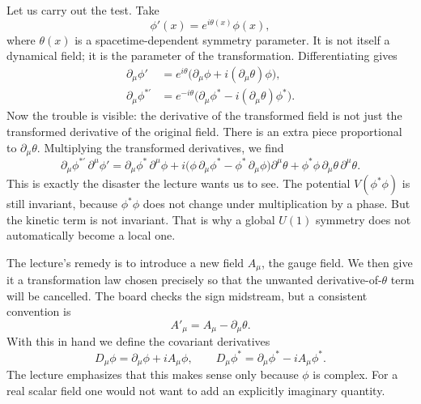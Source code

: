 Let us carry out the test. Take
\begin{equation}
\phi'(x)=e^{i\theta(x)}\phi(x),
\label{eq:local-transform-refined}
\end{equation}
where \(\theta(x)\) is a spacetime-dependent symmetry parameter. It is not itself a dynamical field; it is the parameter of the transformation. Differentiating gives
\begin{align}
\partial_\mu\phi'
&=
e^{i\theta}\big(\partial_\mu\phi+i(\partial_\mu\theta)\phi\big),
\label{eq:dphi-prime-refined}
\\
\partial_\mu\phi^{*\prime}
&=
e^{-i\theta}\big(\partial_\mu\phi^*-i(\partial_\mu\theta)\phi^*\big).
\label{eq:dphistar-prime-refined}
\end{align}
Now the trouble is visible: the derivative of the transformed field is not just the transformed derivative of the original field. There is an extra piece proportional to \(\partial_\mu\theta\). Multiplying the transformed derivatives, we find
\begin{equation}
\partial_\mu\phi^{*\prime}\,\partial^\mu\phi'
=
\partial_\mu\phi^*\,\partial^\mu\phi
+i\big(\phi\,\partial_\mu\phi^*-\phi^*\,\partial_\mu\phi\big)\partial^\mu\theta
+\phi^*\phi\,\partial_\mu\theta\,\partial^\mu\theta.
\label{eq:local-failure-refined}
\end{equation}
This is exactly the disaster the lecture wants us to see. The potential \(V(\phi^*\phi)\) is still invariant, because \(\phi^*\phi\) does not change under multiplication by a phase. But the kinetic term is not invariant. That is why a global \(U(1)\) symmetry does not automatically become a local one.

The lecture's remedy is to introduce a new field \(A_\mu\), the gauge field. We then give it a transformation law chosen precisely so that the unwanted derivative-of-\(\theta\) term will be cancelled. The board checks the sign midstream, but a consistent convention is
\begin{equation}
A'_\mu=A_\mu-\partial_\mu\theta.
\label{eq:gauge-field-transform-refined}
\end{equation}
With this in hand we define the covariant derivatives
\begin{equation}
D_\mu\phi=\partial_\mu\phi+iA_\mu\phi,
\qquad
D_\mu\phi^*=\partial_\mu\phi^*-iA_\mu\phi^*.
\label{eq:covariant-derivatives-refined}
\end{equation}
The lecture emphasizes that this makes sense only because \(\phi\) is complex. For a real scalar field one would not want to add an explicitly imaginary quantity.

